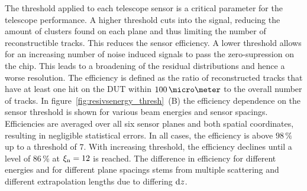 The threshold applied to each telescope sensor is a critical parameter for the telescope performance.
A higher threshold cuts into the signal, reducing the amount of clusters found on each plane and thus limiting the number of reconstructible tracks.
This reduces the sensor efficiency.
A lower threshold allows for an increasing number of noise induced signals to pass the zero-supression on the chip.
This leads to a broadening of the residual distributions and hence a worse resolution. 
The efficiency is defined as the ratio of reconstructed tracks that have at least one hit on the DUT within $100\,\micro\meter$ to the overall number of tracks.
In figure~\ref{fig:resivsenergy_thresh}~(B) the efficiency dependence on the sensor threshold is shown for various beam energies and sensor spacings.
Efficiencies are averaged over all six sensor planes and both spatial coordinates, resulting in negligible statistical errors. 
In all cases, the efficiency is above $98\,\%$ up to a threshold of $7$.
With increasing threshold, the efficiency declines until a level of $86\,\%$ at $\xi_{\textrm{n}} = 12$ is reached.
The difference in efficiency for different energies and for different plane spacings stems from multiple scattering and different extrapolation lengths due to differing $\textrm{d}z$.







